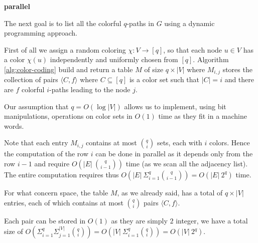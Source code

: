\begin{algorithm}[h]
		
	\small
	\DontPrintSemicolon
	\BlankLine
	\textbf{parallel} 
	\BlankLine
	\caption{$\textsc{preprocess}$: $\textsc{color-coding}$}
	\label{alg:color-coding}
\end{algorithm}

The next goal is to list all the colorful $q$-paths in $G$ using a dynamic programming approach.\medskip

First of all we assign a random coloring $\chi : V \rightarrow [q]$, so that each node $u \in V$ has a color $\chi(u)$ independently and uniformly chosen from $[q]$. Algorithm \ref{alg:color-coding} build and return a table $M$ of size $q \times |V|$ where $M_{i,j}$ stores the collection of pairs $\langle C, f \rangle$ where  $C \subseteq [q]$ is a color set such that $|C| = i$ and there are $f$ colorful $i$-paths leading to the node $j$.\medskip

Our assumption that $q = O(\log |V|)$ allows us to implement, using bit manipulations, operations on color sets in $O(1)$ time as they fit in a machine words.\medskip

Note that each entry $M_{i, j}$ contains at most $\binom{q}{i}$ sets, each with $i$ colors. Hence the computation of the row $i$ can be done in parallel as it depends only from the row $i-1$ and require $O(|E|\ \binom{q}{i-1})$ time (as we scan all the adjacency list). The entire computation requires thus $O(|E|\ \Sigma_{i=1}^{q}{\binom{q}{i-1}}) = O(|E|\ 2^{q})$ time.\bigskip

For what concern space, the table $M$, as we already said, has a total of $q \times |V|$ entries, each of which contains at most $\binom{q}{i}$ pairs $\langle C, f \rangle$.

Each pair can be stored in $O(1)$ as they are simply $2$ integer, we have a total size of $O(\Sigma_{i=1}^{q}{\Sigma_{j=1}^{|V|}{ \binom{q}{i}}}) = O(|V|\ \Sigma_{i=1}^{q}{\binom{q}{i}}) = O(|V|\ 2^{q})$.\bigskip

